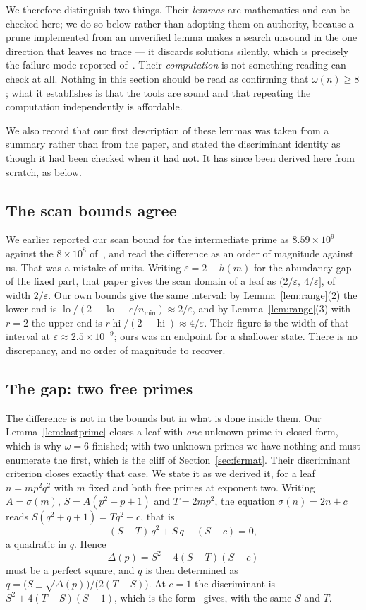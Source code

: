 \documentclass[11pt]{amsart}
\theoremstyle{remark}
\DeclareMathOperator{\lo}{lo}
\DeclareMathOperator{\hi}{hi}
\begin{document}
We therefore distinguish two things. Their \emph{lemmas} are mathematics and can
be checked here; we do so below rather than adopting them on authority, because a
prune implemented from an unverified lemma makes a search unsound in the one
direction that leaves no trace --- it discards solutions silently, which is
precisely the failure mode reported of~\cite{zemann}. Their \emph{computation} is
not something reading can check at all. Nothing in this section should be read as
confirming that $\omega(n) \ge 8$; what it establishes is that the tools are
sound and that repeating the computation independently is affordable.

We also record that our first description of these lemmas was taken from a summary
rather than from the paper, and stated the discriminant identity as though it had
been checked when it had not. It has since been derived here from scratch, as
below.

\subsection{The scan bounds agree}
We earlier reported our scan bound for the intermediate prime as
$8.59 \times 10^{9}$ against the $8 \times 10^{8}$ of~\cite{tty}, and read the
difference as an order of magnitude against us. That was a mistake of units.
Writing $\varepsilon = 2 - h(m)$ for the abundancy gap of the fixed part, that
paper gives the scan domain of a leaf as $(2/\varepsilon,\ 4/\varepsilon]$, of
width $2/\varepsilon$. Our own bounds give the same interval: by
Lemma~\ref{lem:range}(2) the lower end is
$\lo/(2 - \lo + c/n_{\min}) \approx 2/\varepsilon$, and by
Lemma~\ref{lem:range}(3) with $r = 2$ the upper end is
$r\hi/(2-\hi) \approx 4/\varepsilon$. Their figure is the width of that interval
at $\varepsilon \approx 2.5 \times 10^{-9}$; ours was an endpoint for a shallower
state. There is no discrepancy, and no order of magnitude to recover.

\subsection{The gap: two free primes}
The difference is not in the bounds but in what is done inside them. Our
Lemma~\ref{lem:lastprime} closes a leaf with \emph{one} unknown prime in closed
form, which is why $\omega = 6$ finished; with two unknown primes we have nothing
and must enumerate the first, which is the cliff of
Section~\ref{sec:fermat}. Their discriminant criterion closes exactly that case. We state it as we
derived it, for a leaf $n = m p^{2} q^{2}$ with $m$ fixed and both free primes at
exponent two. Writing $A = \sigma(m)$, $S = A(p^{2}+p+1)$ and $T = 2mp^{2}$, the
equation $\sigma(n) = 2n + c$ reads
$S(q^{2}+q+1) = Tq^{2} + c$, that is
\[
  (S - T)\,q^{2} + S\,q + (S - c) = 0 ,
\]
a quadratic in $q$. Hence
\[
  \Delta(p) = S^{2} - 4(S-T)(S-c)
\]
must be a perfect square, and $q$ is then determined as
$q = \bigl(S \pm \sqrt{\Delta(p)}\bigr) / \bigl(2(T-S)\bigr)$. At $c = 1$ the
discriminant is $S^{2} + 4(T-S)(S-1)$, which is the form~\cite{tty} gives, with
the same $S$ and $T$.
\end{document}
